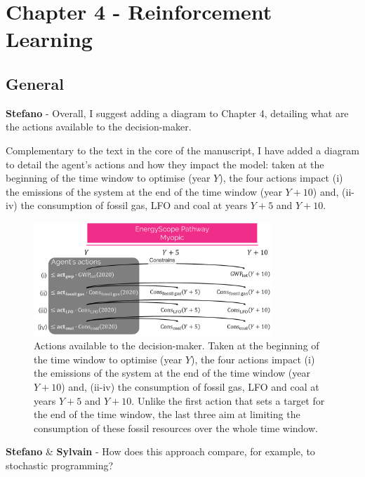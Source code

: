 \documentclass[12pt,a4paper]{article}
\begin{document}
\section{Chapter 4 - Reinforcement Learning}
\label{Chap_RL}

\subsection{General}

\begin{mdframed}[style=comment] %
{\color{orange} \textbf{Stefano}} - Overall, I suggest adding a diagram to Chapter 4, detailing what are the actions available to the decision-maker.
\end{mdframed}

\noindent Complementary to the text in the core of the manuscript, I have added a diagram to detail the agent's actions and how they impact the model: taken at the beginning of the time window to optimise (year $Y$), the four actions impact (i) the emissions of the system at the end of the time window (year $Y+10$) and, (ii-iv) the consumption of fossil gas, LFO and coal at years $Y+5$ and $Y+10$.

\begin{figure}[!htbp]
\centering
\includegraphics[width=0.8\textwidth]{Schematic_actions.pdf}
\caption{Actions available to the decision-maker. Taken at the beginning of the time window to optimise (year $Y$), the four actions impact (i) the emissions of the system at the end of the time window (year $Y+10$) and, (ii-iv) the consumption of fossil gas, LFO and coal at years $Y+5$ and $Y+10$. Unlike the first action that sets a target for the end of the time window, the last three aim at limiting the consumption of these fossil resources over the whole time window.}
\label{fig:Schematic_actions}
\end{figure}

\begin{mdframed}[style=comment] %
{\color{orange} \textbf{Stefano}} \& {\color{purple} \textbf{Sylvain}} - How does this approach compare, for example, to stochastic programming?
\end{mdframed}
\end{document}
